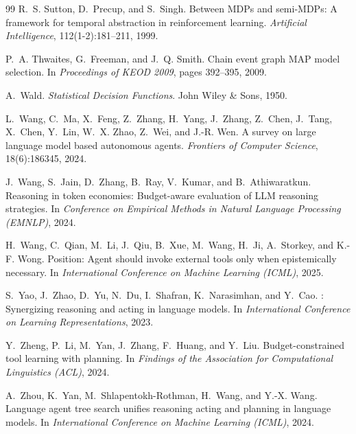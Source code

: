 \documentclass[11pt]{article}
\begin{document}
\begin{thebibliography}{99}
R.~S. Sutton, D.~Precup, and S.~Singh.
\newblock Between {MDPs} and semi-{MDPs}: A framework for temporal abstraction in reinforcement learning.
\newblock \emph{Artificial Intelligence}, 112(1-2):181--211, 1999.

P.~A. Thwaites, G.~Freeman, and J.~Q. Smith.
\newblock Chain event graph {MAP} model selection.
\newblock In \emph{Proceedings of KEOD 2009}, pages 392--395, 2009.

A.~Wald.
\newblock \emph{Statistical Decision Functions}.
\newblock John Wiley \& Sons, 1950.

L.~Wang, C.~Ma, X.~Feng, Z.~Zhang, H.~Yang, J.~Zhang, Z.~Chen, J.~Tang, X.~Chen, Y.~Lin, W.~X. Zhao, Z.~Wei, and J.-R. Wen.
\newblock A survey on large language model based autonomous agents.
\newblock \emph{Frontiers of Computer Science}, 18(6):186345, 2024.

J.~Wang, S.~Jain, D.~Zhang, B.~Ray, V.~Kumar, and B.~Athiwaratkun.
\newblock Reasoning in token economies: Budget-aware evaluation of {LLM} reasoning strategies.
\newblock In \emph{Conference on Empirical Methods in Natural Language Processing (EMNLP)}, 2024.

H.~Wang, C.~Qian, M.~Li, J.~Qiu, B.~Xue, M.~Wang, H.~Ji, A.~Storkey, and K.-F. Wong.
\newblock Position: Agent should invoke external tools only when epistemically necessary.
\newblock In \emph{International Conference on Machine Learning (ICML)}, 2025.

S.~Yao, J.~Zhao, D.~Yu, N.~Du, I.~Shafran, K.~Narasimhan, and Y.~Cao.
: Synergizing reasoning and acting in language models.
\newblock In \emph{International Conference on Learning Representations}, 2023.

Y.~Zheng, P.~Li, M.~Yan, J.~Zhang, F.~Huang, and Y.~Liu.
\newblock Budget-constrained tool learning with planning.
\newblock In \emph{Findings of the Association for Computational Linguistics (ACL)}, 2024.

A.~Zhou, K.~Yan, M.~Shlapentokh-Rothman, H.~Wang, and Y.-X. Wang.
\newblock Language agent tree search unifies reasoning acting and planning in language models.
\newblock In \emph{International Conference on Machine Learning (ICML)}, 2024.

\end{thebibliography}
\end{document}
